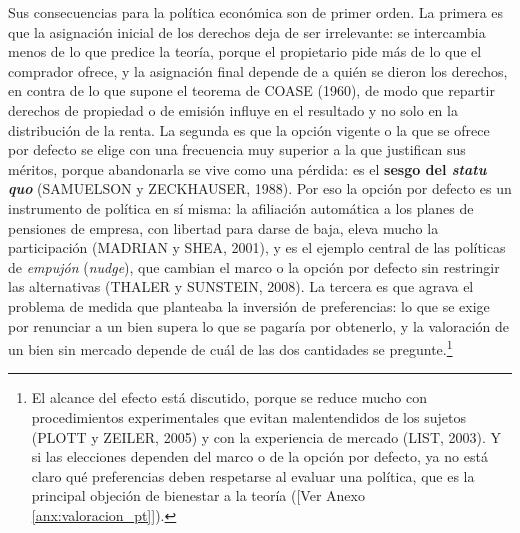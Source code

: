 \documentclass[10pt,a4paper]{article}
\newcommand{\authorfont}[1]{{\fontfamily{EBGaramond-TLF}\selectfont #1}}
\begin{document}
Sus consecuencias para la política económica son de primer orden. La primera es que la asignación inicial de los derechos deja de ser irrelevante: se intercambia menos de lo que predice la teoría, porque el propietario pide más de lo que el comprador ofrece, y la asignación final depende de a quién se dieron los derechos, en contra de lo que supone el teorema de COASE (1960), de modo que repartir derechos de propiedad o de emisión influye en el resultado y no solo en la distribución de la renta. La segunda es que la opción vigente o la que se ofrece por defecto se elige con una frecuencia muy superior a la que justifican sus méritos, porque abandonarla se vive como una pérdida: es el \textbf{sesgo del \textit{statu quo}} (SAMUELSON y ZECKHAUSER, 1988). Por eso la opción por defecto es un instrumento de política en sí misma: la afiliación automática a los planes de pensiones de empresa, con libertad para darse de baja, eleva mucho la participación (MADRIAN y SHEA, 2001), y es el ejemplo central de las políticas de \textit{empujón} (\textit{nudge}), que cambian el marco o la opción por defecto sin restringir las alternativas (THALER y SUNSTEIN, 2008). La tercera es que agrava el problema de medida que planteaba la inversión de preferencias: lo que se exige por renunciar a un bien supera lo que se pagaría por obtenerlo, y la valoración de un bien sin mercado depende de cuál de las dos cantidades se pregunte.\footnote{%
    El alcance del efecto está discutido, porque se reduce mucho con procedimientos experimentales que evitan malentendidos de los sujetos (PLOTT y ZEILER, 2005) y con la experiencia de mercado (LIST, 2003). Y si las elecciones dependen del marco o de la opción por defecto, ya no está claro qué preferencias deben respetarse al evaluar una política, que es la principal objeción de bienestar a la teoría ([\authorfont{Ver Anexo \ref{anx:valoracion_pt}}]).
}
\end{document}
